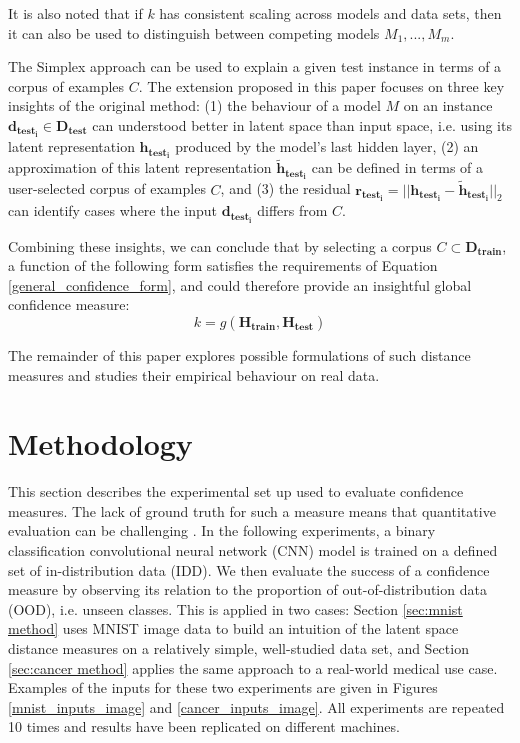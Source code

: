 \documentclass{article}
\begin{document}
It is also noted that if $k$ has consistent scaling across models and data sets, then it can also be used to distinguish between competing models ${M_1, ..., M_m}$.

The Simplex approach can be used to explain a given test instance in terms of a corpus of examples $C$. The extension proposed in this paper focuses on three key insights of the original method: (1) the behaviour of a model $M$ on an instance $\bm{d_{test_i}} \in \bm{D_{test}}$ can understood better in latent space than input space, i.e. using its latent representation $\bm{h_{test_i}}$ produced by the model's last hidden layer, (2) an approximation of this latent representation $\bm{\tilde{h}_{test_i}}$  can be defined in terms of a user-selected corpus of examples $C$, and (3) the residual $\bm{r_{test_i}} = ||\bm{h_{test_i}} - \bm{\tilde{h}_{test_i}}||_2$ can identify cases where the input $\bm{d_{test_i}}$ differs from $C$.

Combining these insights, we can conclude that by selecting a corpus $C \subset \bm{D_{train}}$, a function of the following form satisfies the requirements of Equation \ref{general_confidence_form}, and could therefore provide an insightful global confidence measure:
\begin{equation}\label{simplex_confidence_form}
	k = g(\bm{H_{train}}, \bm{H_{test}})
\end{equation}

The remainder of this paper explores possible formulations of such distance measures and studies their empirical behaviour on real data.



\section{Methodology}

This section describes the experimental set up used to evaluate confidence measures. The lack of ground truth for such a measure means that quantitative evaluation can be challenging \cite[p.8]{papernot_deep_2018}. In the following experiments, a binary classification convolutional neural network (CNN) model is trained on a defined set of in-distribution data (IDD). We then evaluate the success of a confidence measure by observing its relation to the proportion of out-of-distribution data (OOD), i.e. unseen classes.
This is applied in two cases: Section \ref{sec:mnist method} uses MNIST image data to build an intuition of the latent space distance measures on a relatively simple, well-studied data set, and Section \ref{sec:cancer method} applies the same approach to a real-world medical use case. Examples of the inputs for these two experiments are given in Figures \ref{mnist_inputs_image} and \ref{cancer_inputs_image}.
All experiments are repeated 10 times and results have been replicated on different machines.
\end{document}
